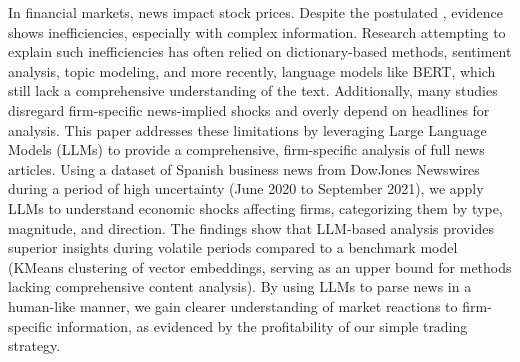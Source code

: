 In financial markets, news impact stock prices. Despite the postulated , evidence shows inefficiencies, especially with complex information. Research attempting to explain such inefficiencies has often relied on dictionary-based methods, sentiment analysis, topic modeling, and more recently, language models like BERT, which still lack a comprehensive understanding of the text. Additionally, many studies disregard firm-specific news-implied shocks and overly depend on headlines for analysis. This paper addresses these limitations by leveraging Large Language Models (LLMs) to provide a comprehensive, firm-specific analysis of full news articles. 
Using a dataset of Spanish business news from DowJones Newswires during a period of high uncertainty (June 2020 to September 2021), we apply LLMs to understand economic shocks affecting firms, categorizing them by type, magnitude, and direction. The findings show that LLM-based analysis provides superior insights during volatile periods compared to a benchmark model (KMeans clustering of vector embeddings, serving as an upper bound for methods lacking comprehensive content analysis). By using LLMs to parse news in a human-like manner, we gain clearer understanding of market reactions to firm-specific information, as evidenced by the profitability of our simple trading strategy.

